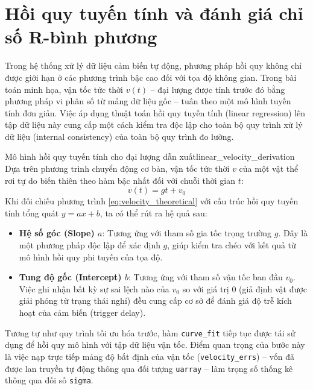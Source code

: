 \section{Hồi quy tuyến tính và đánh giá chỉ số R-bình phương}
\label{sec:linear_regression}

Trong hệ thống xử lý dữ liệu cảm biến tự động, phương pháp hồi quy không chỉ được giới hạn ở các phương trình bậc cao đối với tọa độ không gian. Trong bài toán minh họa, vận tốc tức thời $v(t)$ – đại lượng được tính trước đó bằng phương pháp vi phân số từ mảng dữ liệu gốc – tuân theo một mô hình tuyến tính đơn giản. Việc áp dụng thuật toán hồi quy tuyến tính (linear regression) lên tập dữ liệu này cung cấp một cách kiểm tra độc lập cho toàn bộ quy trình xử lý dữ liệu (internal consistency) của toàn bộ quy trình đo lường.

\begin{derivation}{Mô hình hồi quy tuyến tính cho đại lượng dẫn xuất}{linear_velocity_derivation}
Dựa trên phương trình chuyển động cơ bản, vận tốc tức thời $v$ của một vật thể rơi tự do biến thiên theo hàm bậc nhất đối với chuỗi thời gian $t$:
\begin{equation}
    v(t) = gt + v_0 \label{eq:velocity_theoretical}
\end{equation}
Khi đối chiếu phương trình \ref{eq:velocity_theoretical} với cấu trúc hồi quy tuyến tính tổng quát $y = ax + b$, ta có thể rút ra hệ quả sau:
\begin{itemize}
    \item \textbf{Hệ số góc (Slope) $a$}: Tương ứng với tham số gia tốc trọng trường $g$. Đây là một phương pháp độc lập để xác định $g$, giúp kiểm tra chéo với kết quả từ mô hình hồi quy phi tuyến của tọa độ.
    \item \textbf{Tung độ gốc (Intercept) $b$}: Tương ứng với tham số vận tốc ban đầu $v_0$. Việc ghi nhận bất kỳ sự sai lệch nào của $v_0$ so với giá trị $0$ (giả định vật được giải phóng từ trạng thái nghỉ) đều cung cấp cơ sở để đánh giá độ trễ kích hoạt của cảm biến (trigger delay).
\end{itemize}
\end{derivation}

Tương tự như quy trình tối ưu hóa trước, hàm \texttt{curve\_fit} tiếp tục được tái sử dụng để hồi quy mô hình với tập dữ liệu vận tốc. Điểm quan trọng của bước này là việc nạp trực tiếp mảng độ bất định của vận tốc (\texttt{velocity\_errs}) – vốn đã được lan truyền tự động thông qua đối tượng \texttt{uarray} – làm trọng số thống kê thông qua đối số \texttt{sigma}.

